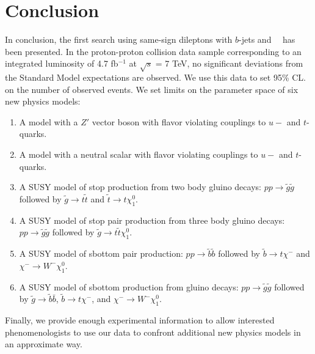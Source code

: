 \section{Conclusion}
\label{sec:conclusion}
In conclusion, the first search using same-sign dileptons with $b$-jets and \met~~has 
been presented. In the
proton-proton collision data sample corresponding to an integrated luminosity of 
 4.7 fb$^{-1}$ at $\sqrt{s}$ = 7 TeV,
no significant deviations from the Standard Model expectations are observed. 
We use this data to set 95\% CL. on the
number of observed events.
We set limits on the parameter space of six new physics models:
\begin{enumerate}
\item A model with a $Z'$ vector boson with flavor violating couplings to $u-$ and $t$-quarks.

\item A model with a neutral scalar with flavor violating couplings to $u-$ and $t$-quarks.

\item A SUSY model of stop production from two body gluino decays: 
$pp \to \widetilde{g} \widetilde{g}$ followed by
$\widetilde{g} \to t\widetilde{t}$ and $\widetilde{t} \to t \chi_1^0$.

\item A SUSY model of stop pair production from three body gluino decays:
$pp \to \widetilde{g} \widetilde{g}$ followed by
$\widetilde{g} \to t\widetilde{t}\chi_1^0$.

\item A SUSY model of sbottom pair production: $pp \to \tilde{b}\tilde{b}$ followed
by $\tilde{b} \to t\chi^{-}$ and $\chi^{-} \to W^- \chi_1^0$.

\item A SUSY model of sbottom production from gluino decays:
$pp \to \widetilde{g} \widetilde{g}$ followed by
$\widetilde{g} \to \widetilde{b}\bar{b}$,
$\widetilde{b} \to t\chi^-$, and $\chi^{-} \to W^- \chi_1^0$.
\end{enumerate}

\noindent Finally, we provide enough experimental information to allow interested
phenomenologists to use our data to confront additional new physics models in 
an approximate way.
